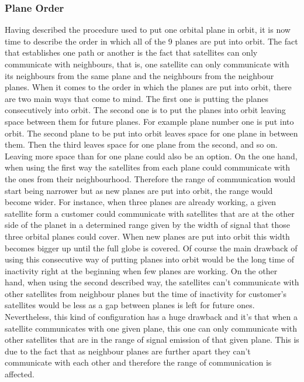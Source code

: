 \subsubsection{Plane Order}
Having described the procedure used to put one orbital plane in orbit, it is now time to describe the order in which all of the 9 planes are put into orbit. The fact that establishes one path or another is the fact that satellites can only communicate with neighbours, that is, one satellite can only communicate with its neighbours from the same plane and the neighbours from the neighbour planes.
\newline\newline
When it comes to the order in which the planes are put into orbit, there are two main ways that come to mind. The first one is putting the planes consecutively into orbit. The second one is to put the planes into orbit leaving space between them for future planes. For example plane number one is put into orbit. The second plane to be put into orbit leaves space for one plane in between them. Then the third leaves space for one plane from the second, and so on. Leaving more space than for one plane could also be an option.
\newline\newline
On the one hand, when using the first way the satellites from each plane could communicate with the ones from their neighbourhood. Therefore the range of communication would start being narrower but as new planes are put into orbit, the range would become wider. For instance, when three planes are already working, a given satellite form a customer could communicate with satellites that are at the other side of the planet in a determined range given by the width of signal that those three orbital planes could cover. When new planes are put into orbit this width becomes bigger up until the full globe is covered. Of course the main drawback of using this consecutive way of putting planes into orbit would be the long time of inactivity right at the beginning when few planes are working.
\newline\newline
On the other hand, when using the second described way, the satellites can't communicate with other satellites from neighbour planes but the time of inactivity for customer's satellites would be less as a gap between planes is left for future ones. Nevertheless, this kind of configuration has a huge drawback and it's that when a satellite communicates with one given plane, this one can only communicate with other satellites that are in the range of signal emission of that given plane. This is due to the fact that as neighbour planes are further apart they can't communicate with each other and therefore the range of communication is affected.
